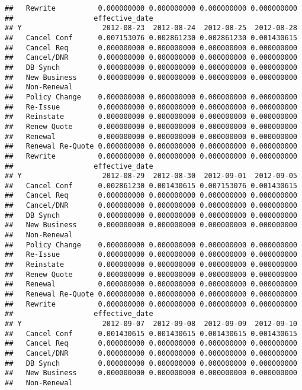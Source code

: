 \documentclass[]{article}
\begin{document}
\begin{verbatim}
##   Rewrite          0.000000000 0.000000000 0.000000000 0.000000000
##                   effective_date
## Y                   2012-08-23  2012-08-24  2012-08-25  2012-08-28
##   Cancel Conf      0.007153076 0.002861230 0.002861230 0.001430615
##   Cancel Req       0.000000000 0.000000000 0.000000000 0.000000000
##   Cancel/DNR       0.000000000 0.000000000 0.000000000 0.000000000
##   DB Synch         0.000000000 0.000000000 0.000000000 0.000000000
##   New Business     0.000000000 0.000000000 0.000000000 0.000000000
##   Non-Renewal                                                     
##   Policy Change    0.000000000 0.000000000 0.000000000 0.000000000
##   Re-Issue         0.000000000 0.000000000 0.000000000 0.000000000
##   Reinstate        0.000000000 0.000000000 0.000000000 0.000000000
##   Renew Quote      0.000000000 0.000000000 0.000000000 0.000000000
##   Renewal          0.000000000 0.000000000 0.000000000 0.000000000
##   Renewal Re-Quote 0.000000000 0.000000000 0.000000000 0.000000000
##   Rewrite          0.000000000 0.000000000 0.000000000 0.000000000
##                   effective_date
## Y                   2012-08-29  2012-08-30  2012-09-01  2012-09-05
##   Cancel Conf      0.002861230 0.001430615 0.007153076 0.001430615
##   Cancel Req       0.000000000 0.000000000 0.000000000 0.000000000
##   Cancel/DNR       0.000000000 0.000000000 0.000000000 0.000000000
##   DB Synch         0.000000000 0.000000000 0.000000000 0.000000000
##   New Business     0.000000000 0.000000000 0.000000000 0.000000000
##   Non-Renewal                                                     
##   Policy Change    0.000000000 0.000000000 0.000000000 0.000000000
##   Re-Issue         0.000000000 0.000000000 0.000000000 0.000000000
##   Reinstate        0.000000000 0.000000000 0.000000000 0.000000000
##   Renew Quote      0.000000000 0.000000000 0.000000000 0.000000000
##   Renewal          0.000000000 0.000000000 0.000000000 0.000000000
##   Renewal Re-Quote 0.000000000 0.000000000 0.000000000 0.000000000
##   Rewrite          0.000000000 0.000000000 0.000000000 0.000000000
##                   effective_date
## Y                   2012-09-07  2012-09-08  2012-09-09  2012-09-10
##   Cancel Conf      0.001430615 0.001430615 0.001430615 0.001430615
##   Cancel Req       0.000000000 0.000000000 0.000000000 0.000000000
##   Cancel/DNR       0.000000000 0.000000000 0.000000000 0.000000000
##   DB Synch         0.000000000 0.000000000 0.000000000 0.000000000
##   New Business     0.000000000 0.000000000 0.000000000 0.000000000
##   Non-Renewal                                                     

\end{verbatim}
\end{document}
